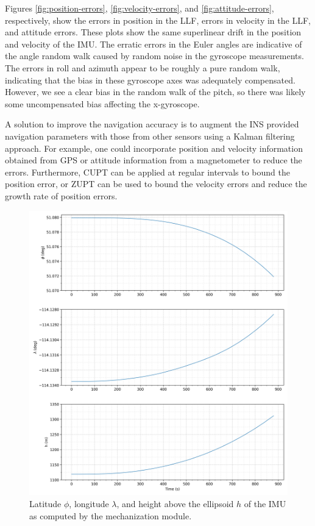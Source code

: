\documentclass[11pt, oneside]{article}   	%
\begin{document}
Figures \ref{fig:position-errors}, \ref{fig:velocity-errors}, and \ref{fig:attitude-errors}, respectively, show the errors in position in the LLF, errors in velocity in the LLF, and attitude errors.  These plots show the same superlinear drift in the position and velocity of the IMU.  The erratic errors in the Euler angles are indicative of the angle random walk caused by random noise in the gyroscope measurements.  The errors in roll and azimuth appear to be roughly a pure random walk, indicating that the bias in these gyroscope axes was adequately compensated.  However, we see a clear bias in the random walk of the pitch, so there was likely some uncompensated bias affecting the x-gyroscope.

A solution to improve the navigation accuracy is to augment the INS provided navigation parameters with those from other sensors using a Kalman filtering approach.  For example, one could incorporate position and velocity information obtained from GPS or attitude information from a magnetometer to reduce the errors.  Furthermore, CUPT can be applied at regular intervals to bound the position error, or ZUPT can be used to bound the velocity errors and reduce the growth rate of position errors.

\begin{figure}[!htbp]
\centerline{\includegraphics[width=16cm]{img/position.png}}
\caption{\label{fig:position} Latitude $\phi$, longitude $\lambda$, and height above the ellipsoid $h$ of the IMU as computed by the mechanization module.}
\end{figure}
\end{document}
